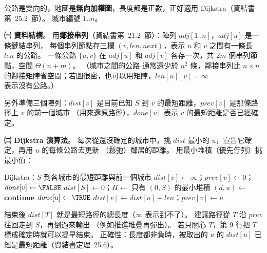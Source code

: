 \begin{pastsoln}
公路是雙向的，地圖是\textbf{無向加權圖}，長度都是正數，正好適用 Dijkstra（資結書第~25.2~節）。 城市編號 $1..n$。

\textbf{㈠ 資料結構}。 用\textbf{鄰接串列}（資結書第~21.2~節）：陣列 $\mathit{adj}[1..n]$，$\mathit{adj}[u]$ 是一條鏈結串列，
每個串列節點存三欄 $(v, \mathit{len}, \mathit{next})$，表示 $u$ 和 $v$ 之間有一條長 $\mathit{len}$ 的公路。 一條公路
$\{u, v\}$ 在 $\mathit{adj}[u]$ 和 $\mathit{adj}[v]$ 各存一次，共 $2m$ 個串列節點，空間 $\Theta(n + m)$。 （城市之間的公路
通常遠少於 $n^2$ 條，鄰接串列比 $n \times n$ 的鄰接矩陣省空間；若圖很密，也可以用矩陣，$\mathit{len}[u][v] = \infty$
表示沒有公路。）

另外準備三個陣列：$\mathit{dist}[v]$ 是目前已知 $S$ 到 $v$ 的最短距離，$\mathit{prev}[v]$ 是那條路徑上 $v$ 的前一個城市
（用來還原路徑），$\mathit{done}[v]$ 表示 $v$ 的最短距離是否已經確定。

\textbf{㈡ Dijkstra 演算法}。 每次從還沒確定的城市中，挑 $\mathit{dist}$ 最小的 $u$，宣告它確定，再用 $u$ 的每條公路去更新
（鬆弛）鄰居的距離。 用最小堆積（優先佇列）挑最小值：
\begin{pseudo}[unbreakable]{Dijkstra：$S$ 到各城市的最短距離與前一個城市}
        \State $\mathit{dist}[v] \gets \infty$；$\mathit{prev}[v] \gets 0$；$\mathit{done}[v] \gets \FALSE$
    \EndFor
    \State $\mathit{dist}[S] \gets 0$；$H \gets$ 只有 $(0, S)$ 的最小堆積
        \State $(d, u) \gets$ 
            \State \textbf{continue} 
        \EndIf
        \State $\mathit{done}[u] \gets \TRUE$
                \State $\mathit{dist}[v] \gets \mathit{dist}[u] + \mathit{len}$；$\mathit{prev}[v] \gets u$
                \State {}
            \EndIf
        \EndFor
    \EndWhile
\EndProcedure
\end{pseudo}
結束後 $\mathit{dist}[T]$ 就是最短路徑的總長度（$\infty$ 表示到不了）。 建議路徑從 $T$ 沿 $\mathit{prev}$ 往回走到 $S$，再倒過來輸出
（例如推進堆疊再彈出）。 若只關心 $T$，第 9 行把 $T$ 標成確定時就可以提早結束。 正確性：長度都非負時，被取出的 $u$ 的
$\mathit{dist}[u]$ 已經是最短距離（資結書定理~25.6）。


\end{pastsoln}
